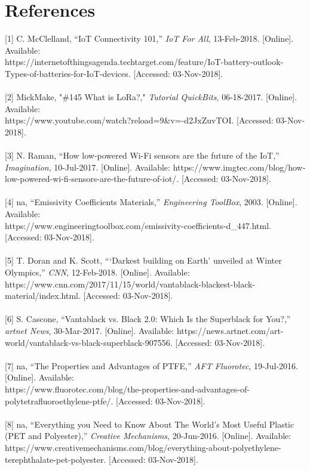 \documentclass[10pt,draftclsnofoot,onecolumn,letterpaper]{article}
\begin{document}
\section{References}

[1] C. McClelland, “IoT Connectivity 101,” \textit{IoT For All}, 13-Feb-2018. [Online]. Available: \\https://internetofthingsagenda.techtarget.com/feature/IoT-battery-outlook-Types-of-batteries-for-IoT-devices. [Accessed: 03-Nov-2018].\\
\\{[}2] MickMake, "\#145 What is LoRa?," \textit{Tutorial QuickBits}, 06-18-2017. [Online]. Available:\\ https://www.youtube.com/watch?reload=9\&v=-d2JxZuvTOI. [Accessed: 03-Nov-2018].\\
\\{[}3] N. Raman, “How low-powered Wi-Fi sensors are the future of the IoT,” \textit{Imagination}, 10-Jul-2017. [Online]. Available: https://www.imgtec.com/blog/how-low-powered-wi-fi-sensors-are-the-future-of-iot/. [Accessed: 03-Nov-2018].\\
\\{[}4] na, “Emissivity Coefficients Materials,” \textit{Engineering ToolBox}, 2003. [Online]. Available:\\ https://www.engineeringtoolbox.com/emissivity-coefficients-d\_447.html. [Accessed: 03-Nov-2018].\\
\\{[}5] T. Doran and K. Scott, “‘Darkest building on Earth’ unveiled at Winter Olympics,” \textit{CNN}, 12-Feb-2018. [Online]. Available: https://www.cnn.com/2017/11/15/world/vantablack-blackest-black-material/index.html. [Accessed: 03-Nov-2018].\\
\\{[}6] S. Cascone, “Vantablack vs. Black 2.0: Which Is the Superblack for You?,” \textit{artnet News}, 30-Mar-2017. [Online]. Available: https://news.artnet.com/art-world/vantablack-vs-black-superblack-907556. [Accessed: 03-Nov-2018].\\
\\{[}7] na, “The Properties and Advantages of PTFE,” \textit{AFT Fluorotec}, 19-Jul-2016. [Online]. Available:\\ https://www.fluorotec.com/blog/the-properties-and-advantages-of-polytetrafluoroethylene-ptfe/. [Accessed: 03-Nov-2018].\\
\\{[}8] na, “Everything you Need to Know About The World’s Most Useful Plastic (PET and Polyester),” \textit{Creative Mechanisms}, 20-Jun-2016. [Online]. Available: https://www.creativemechanisms.com/blog/everything-about-polyethylene-terephthalate-pet-polyester. [Accessed: 03-Nov-2018].\\
\end{document}
